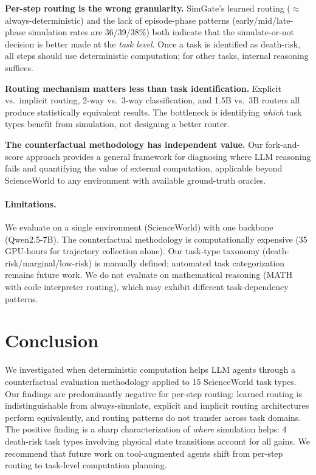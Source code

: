 \documentclass[11pt,a4paper]{article}
\begin{document}
\textbf{Per-step routing is the wrong granularity.} SimGate's learned routing ($\approx$always-deterministic) and the lack of episode-phase patterns (early/mid/late-phase simulation rates are 36/39/38\%) both indicate that the simulate-or-not decision is better made at the \emph{task level}. Once a task is identified as death-risk, all steps should use deterministic computation; for other tasks, internal reasoning suffices.

\textbf{Routing mechanism matters less than task identification.} Explicit vs.\ implicit routing, 2-way vs.\ 3-way classification, and 1.5B vs.\ 3B routers all produce statistically equivalent results. The bottleneck is identifying \emph{which} task types benefit from simulation, not designing a better router.

\textbf{The counterfactual methodology has independent value.} Our fork-and-score approach provides a general framework for diagnosing where LLM reasoning fails and quantifying the value of external computation, applicable beyond ScienceWorld to any environment with available ground-truth oracles.

\paragraph{Limitations.}
We evaluate on a single environment (ScienceWorld) with one backbone (Qwen2.5-7B). The counterfactual methodology is computationally expensive (35 GPU-hours for trajectory collection alone). Our task-type taxonomy (death-risk/marginal/low-risk) is manually defined; automated task categorization remains future work. We do not evaluate on mathematical reasoning (MATH with code interpreter routing), which may exhibit different task-dependency patterns.

\section{Conclusion}

We investigated when deterministic computation helps LLM agents through a counterfactual evaluation methodology applied to 15 ScienceWorld task types. Our findings are predominantly negative for per-step routing: learned routing is indistinguishable from always-simulate, explicit and implicit routing architectures perform equivalently, and routing patterns do not transfer across task domains. The positive finding is a sharp characterization of \emph{where} simulation helps: 4 death-risk task types involving physical state transitions account for all gains. We recommend that future work on tool-augmented agents shift from per-step routing to task-level computation planning.
\end{document}
